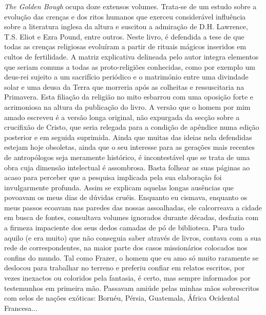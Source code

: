 \emph{The Golden Bough }ocupa doze extensos volumes. Trata-se de um
estudo sobre a evolução das crenças e dos ritos humanos que exerceu
considerável influência sobre a literatura inglesa da altura e suscitou
a admiração de D.H. Lawrence,
T.S. Eliot e Ezra Pound, entre outros. Neste livro, é defendida a tese
de que todas as crenças religiosas evoluíram a partir de rituais mágicos
inseridos em cultos de fertilidade. A matriz explicativa delineada pelo
autor integra elementos que seriam comuns a todas as proto-religiões
conhecidas, como por exemplo um deus-rei sujeito a um sacrifício
periódico e o matrimónio entre uma divindade solar e uma deusa da Terra
que morreria após as colheitas e ressuscitaria na Primavera. Esta
filiação da religião no mito esbarrou com uma oposição forte e
acrimoniosa na altura da publicação do livro. A versão que o homem por
mim amado escreveu é a versão longa original, não expurgada da secção
sobre a crucifixão de Cristo, que seria relegada para a condição de
apêndice numa edição posterior e em seguida suprimida. Ainda que muitas
das ideias nela defendidas estejam hoje obsoletas, ainda que o seu
interesse para as gerações mais recentes de antropólogos seja meramente
histórico, é incontestável que se trata de uma
obra cuja dimensão intelectual é assombrosa. Basta folhear as suas
páginas ao acaso para perceber que a pesquisa implicada pela sua
elaboração foi invulgarmente profunda. Assim se explicam aquelas
longas ausências que povoavam os meus dias de dúvidas cruéis. Enquanto
eu cismava, enquanto os meus passos ecoavam nas paredes das nossas
assoalhadas, ele calcorreava a cidade em busca de fontes, consultava
volumes ignorados durante décadas, desfazia com a firmeza impaciente dos
seus dedos camadas de pó de biblioteca. Para tudo aquilo (e era muito)
que não conseguia saber através de livros, contava com a sua rede de
correspondentes, na maior parte dos casos missionários colocados nos
confins do mundo. Tal como Frazer, o homem que eu amo só muito raramente
se deslocou para trabalhar no terreno e preferiu confiar em relatos
escritos, por vezes inexactos ou coloridos pela fantasia, é certo, mas
sempre informados por testemunhos em primeira mão. Passavam amiúde
pelas minhas mãos sobrescritos com selos de nações exóticas: Bornéu,
Pérsia, Guatemala, África Ocidental Francesa...

